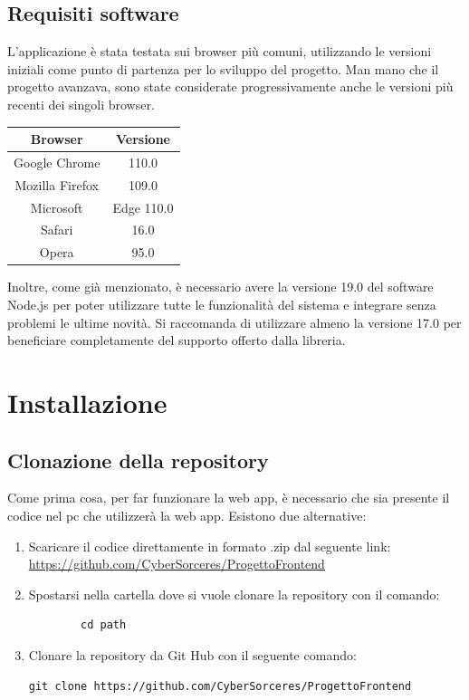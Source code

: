 \documentclass{article}
\begin{document}
\subsection{Requisiti software}
L'applicazione è stata testata sui browser più comuni, utilizzando le versioni iniziali come punto di partenza per lo sviluppo del progetto. Man mano che il progetto avanzava, sono state considerate progressivamente anche le versioni più recenti dei singoli browser.
\begin{center}
\begin{tabular}{|c|c|}
\hline
\rowcolor{Blue}
Browser & Versione \\
\hline
\rowcolor{LighterBlue}
Google Chrome & 110.0 \\
\hline
\rowcolor{LightBlue}
Mozilla Firefox & 109.0 \\
\hline
\rowcolor{LighterBlue}
Microsoft & Edge 110.0 \\
\hline
\rowcolor{LightBlue}
Safari & 16.0 \\
\hline
\rowcolor{LighterBlue}
Opera & 95.0 \\
\hline
\end{tabular}
\end{center}
\label{tab:requisitisw} 

\vspace{1cm} Inoltre, come già menzionato, è necessario avere la versione 19.0 del software Node.js per poter utilizzare tutte le funzionalità del sistema e integrare senza problemi le ultime novità. Si raccomanda di utilizzare almeno la versione 17.0 per beneficiare completamente del supporto offerto dalla libreria.

\section{Installazione}
\subsection{Clonazione della repository}
Come prima cosa, per far funzionare la web app, è necessario che sia presente il codice nel pc che utilizzerà la web app. Esistono due alternative: 
\begin{enumerate}
    \item Scaricare il codice direttamente in formato .zip dal seguente link:\\
    \href{https://github.com/CyberSorceres/ProgettoFrontend}{https://github.com/CyberSorceres/ProgettoFrontend}
    \item Spostarsi nella cartella dove si vuole clonare la repository con il comando:
    \begin{lstlisting}
        cd path 
    \end{lstlisting}
    \item Clonare la repository da Git Hub con il seguente comando: \\
    \begin{lstlisting}
git clone https://github.com/CyberSorceres/ProgettoFrontend
    \end{lstlisting}
\end{enumerate}
\end{document}
